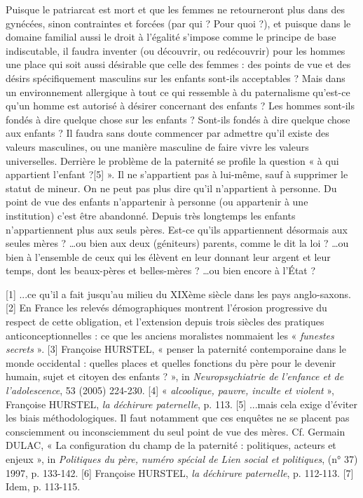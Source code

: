  Puisque le patriarcat est mort et que les femmes ne retourneront plus dans des gynécées, sinon contraintes et forcées (par qui ? Pour quoi ?), et puisque dans le domaine familial aussi le droit à l'égalité s'impose comme le principe de base indiscutable, il faudra inventer (ou découvrir, ou redécouvrir) pour les hommes une place qui soit aussi désirable que celle des femmes : des points de vue et des désirs spécifiquement masculins sur les enfants sont-ils acceptables ? Mais dans un environnement allergique à tout ce qui ressemble à du paternalisme qu'est-ce qu'un homme est autorisé à désirer concernant des enfants ? Les hommes sont-ils fondés à dire quelque chose sur les enfants ? Sont-ils fondés à dire quelque chose aux enfants ? Il faudra sans doute commencer par admettre qu'il existe des valeurs masculines, ou une manière masculine de faire vivre les valeurs universelles.
 Derrière le problème de la paternité se profile la question « à qui appartient l'enfant ?[5] ». Il ne s'appartient pas à lui-même, sauf à supprimer le statut de mineur. On ne peut pas plus dire qu'il n'appartient à personne. Du point de vue des enfants n'appartenir à personne (ou appartenir à une institution) c'est être abandonné. Depuis très longtemps les enfants n'appartiennent plus aux seuls pères. Est-ce qu'ils appartiennent désormais aux seules mères ? …ou bien aux deux (géniteurs) parents, comme le dit la loi ? …ou bien à l'ensemble de ceux qui les élèvent en leur donnant leur argent et leur temps, dont les beaux-pères et belles-mères ? …ou bien encore à l'État ?
 
[1] ...ce qu'il a fait jusqu'au milieu du XIXème siècle dans les pays anglo-saxons.
[2] En France les relevés démographiques montrent l'érosion progressive du respect de cette obligation, et l'extension depuis trois siècles des pratiques anticonceptionnelles : ce que les anciens moralistes nommaient les « \emph{funestes secrets} ».
[3] Françoise HURSTEL, « penser la paternité contemporaine dans le monde occidental : quelles places et quelles fonctions du père pour le devenir humain, sujet et citoyen des enfants ? », in \emph{Neuropsychiatrie de l'enfance et de l'adolescence}, 53 (2005) 224-230. 
[4] « \emph{alcoolique, pauvre, inculte et violent} », Françoise HURSTEL, \emph{la déchirure paternelle}, p. 113.
[5] ...mais cela exige d'éviter les biais méthodologiques. Il faut notamment que ces enquêtes ne se placent pas consciemment ou inconsciemment du seul point de vue des mères. Cf. Germain DULAC, « La configuration du champ de la paternité : politiques, acteurs et enjeux », in \emph{Politiques du père, numéro spécial de Lien social et politiques}, (n° 37) 1997, p. 133-142.
[6] Françoise HURSTEL, \emph{la déchirure paternelle}, p. 112-113. 
[7] Idem, p. 113-115.